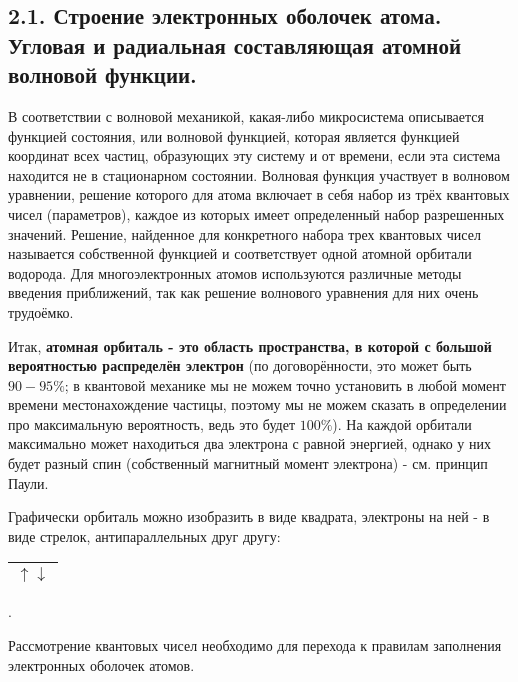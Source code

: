 
\subsection{2.1. Строение электронных оболочек атома. Угловая и радиальная составляющая атомной волновой функции.} 

\par\bigskip

В соответствии с волновой механикой, какая-либо микросистема описывается функцией состояния, или волновой
функцией, которая является функцией координат всех частиц, образующих эту систему и от времени, если эта система
находится не в стационарном состоянии. Волновая функция участвует в волновом уравнении, решение которого для
атома включает в себя набор из трёх квантовых чисел (параметров), каждое из которых имеет определенный набор
разрешенных значений. Решение, найденное для конкретного набора трех квантовых чисел называется собственной
функцией и соответствует одной атомной орбитали водорода. Для многоэлектронных атомов используются различные
методы введения приближений, так как решение волнового уравнения для них очень трудоёмко.

\par\smallskip

Итак, \textbf{атомная орбиталь - это область пространства, в которой с большой вероятностью распределён электрон}  (по
договорённости, это может быть $90-95\%$; в квантовой механике мы не можем точно установить в любой момент времени
местонахождение частицы, поэтому мы не можем сказать в определении про максимальную вероятность, ведь это будет
$100\%$). На каждой орбитали максимально может находиться два электрона с равной энергией, однако у них будет разный
спин (собственный магнитный момент электрона) - см. принцип Паули.

\par\smallskip

Графически орбиталь можно изобразить в виде квадрата, электроны на ней - в виде стрелок, антипараллельных друг
другу: 
\begin{tabular}[c]{|l|}
	\hline	
		$\uparrow\downarrow$ \\ \hline
\end{tabular}.

\par\bigskip
\par\bigskip

Рассмотрение квантовых чисел необходимо для перехода к правилам заполнения электронных оболочек атомов.

